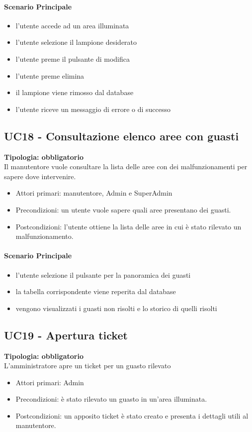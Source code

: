 \documentclass[12pt]{article}
\begin{document}
\paragraph{Scenario Principale}
\begin{itemize}
	\item l'utente accede ad un area illuminata
	\item l'utente selezione il lampione desiderato
	\item l'utente preme il pulsante di modifica
	\item l'utente preme elimina
	\item il lampione viene rimosso dal database
	\item l'utente riceve un messaggio di errore o di successo
\end{itemize}


\subsection{UC18 - Consultazione elenco aree con guasti}
\textbf{Tipologia: obbligatorio}\\
Il manutentore vuole consultare la lista delle aree con dei malfunzionamenti per sapere dove intervenire.
\begin{itemize}
	\item Attori primari: manutentore, Admin e SuperAdmin
	\item Precondizioni: un utente vuole sapere quali aree presentano dei guasti.\\
	\item Postcondizioni: l'utente ottiene la lista delle aree in cui è stato rilevato un malfunzionamento.
\end{itemize}
\paragraph{Scenario Principale}
\begin{itemize}
	\item l'utente selezione il pulsante per la panoramica dei guasti
	\item la tabella corrispondente viene reperita dal database
	\item vengono visualizzati i guasti non risolti e lo storico di quelli risolti
\end{itemize}


\subsection{UC19 - Apertura ticket}
\textbf{Tipologia: obbligatorio}\\
L'amministratore apre un ticket per un guasto rilevato
\begin{itemize}
	\item Attori primari: Admin
	\item Precondizioni: è stato rilevato un guasto in un'area illuminata.
	\item Postcondizioni: un apposito ticket è stato creato e presenta i dettagli utili al manutentore.
\end{itemize}
\end{document}
